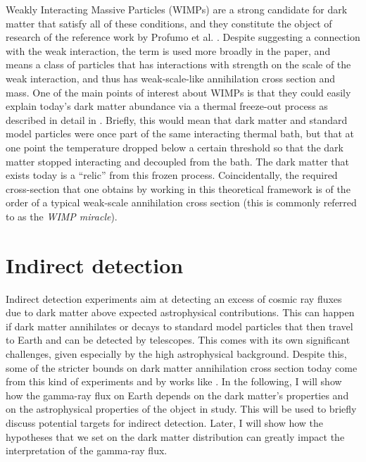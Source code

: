 Weakly Interacting Massive Particles (WIMPs) are a strong candidate for dark matter that satisfy all of these conditions, and they constitute the object of research of the reference work by Profumo et al. \cite{Profumo_2018}. Despite suggesting a connection with the weak interaction, the term is used more broadly in the paper, and means a class of particles that has interactions with strength on the scale of the weak interaction, and thus has weak-scale-like annihilation cross section and mass. One of the main points of interest about WIMPs is that they could easily explain today's dark matter abundance via a thermal freeze-out process as described in detail in \cite[Chapter 4]{Cirelli_2024}. Briefly, this would mean that dark matter and standard model particles were once part of the same interacting thermal bath, but that at one point the temperature dropped below a certain threshold so that the dark matter stopped interacting and decoupled from the bath. The dark matter that exists today is a ``relic'' from this frozen process. Coincidentally, the required cross-section that one obtains by working in this theoretical framework is of the order of a typical weak-scale annihilation cross section (this is commonly referred to as the \emph{WIMP miracle}).

\section{Indirect detection}\label{sec:indirect_detection}
Indirect detection experiments aim at detecting an excess of cosmic ray fluxes due to dark matter above expected astrophysical contributions. This can happen if dark matter annihilates or decays to standard model particles that then travel to Earth and can be detected by telescopes. This comes with its own significant challenges, given especially by the high astrophysical background. Despite this, some of the stricter bounds on dark matter annihilation cross section today \cite{Hooper_2018} come from this kind of experiments and by works like \cite{Profumo_2018}. In the following, I will show how the gamma-ray flux on Earth depends on the dark matter's properties and on the astrophysical properties of the object in study. This will be used to briefly discuss potential targets for indirect detection. Later, I will show how the hypotheses that we set on the dark matter distribution can greatly impact the interpretation of the gamma-ray flux.

